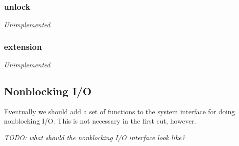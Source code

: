 \documentclass[11pt, letterpaper]{article}
\begin{document}
\subsubsection{unlock}
\emph{Unimplemented}

\subsubsection{extension}
\emph{Unimplemented}

\subsection{Nonblocking I/O}

Eventually we should add a set of functions to the system interface for
doing nonblocking I/O.  This is not necessary in the first cut, however.

\emph{TODO: what should the nonblocking I/O interface look like?}
\end{document}

